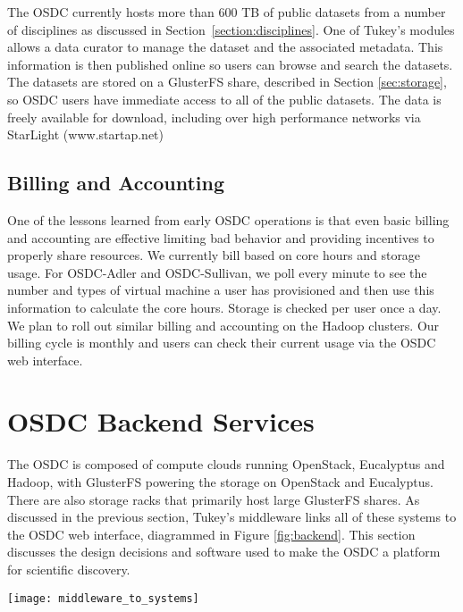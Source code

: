 \documentclass[11pt,twocolumn]{article}
\begin{document}
The OSDC currently hosts more than 600 TB of public datasets from a
number of disciplines as discussed in Section~\ref{section:disciplines}.
One of Tukey's modules allows a data curator to manage the
dataset and the associated metadata. This information is then
published online so users can browse and search the datasets. The
datasets are stored on a GlusterFS share, described in Section
\ref{sec:storage}, so OSDC users have immediate access to all of the
public datasets. The data is freely available for download, including
over high performance networks via StarLight (www.startap.net) 


\subsection{Billing and Accounting}
One of the lessons learned from early OSDC operations is that even
basic billing and accounting are effective limiting bad behavior and
providing incentives to properly share resources. We currently bill
based on core hours and storage usage. For OSDC-Adler and
OSDC-Sullivan, we poll every minute to see the number and types of
virtual machine a user has provisioned and then use this information
to calculate the core hours. Storage is
checked per user once a day. We plan to roll out similar
billing and accounting on the Hadoop clusters. Our billing cycle is
monthly and users can check their current usage via the OSDC web
interface.

\section{OSDC Backend Services}

The OSDC is composed of compute clouds running OpenStack, Eucalyptus and
Hadoop, with GlusterFS powering the storage on OpenStack and
Eucalyptus. There are also storage racks that primarily host large
GlusterFS shares. As discussed in the previous section, Tukey's
middleware links all of these systems to the OSDC web interface,
diagrammed in Figure \ref{fig:backend}. This section discusses the
design decisions and software used to make the OSDC a platform for
scientific discovery.

\begin{figure*}[ht]
  \centering
    \texttt{[image: middleware\_to\_systems]}
    \caption{A diagram of the current OSDC clusters, with the solid
      arrows indicating systems fully operational and accessible with
      Tukey. The Hadoop clusters are operational and support some of
      the Tukey services but not all of them.}
  \label{fig:backend}
\end{figure*}
\end{document}

